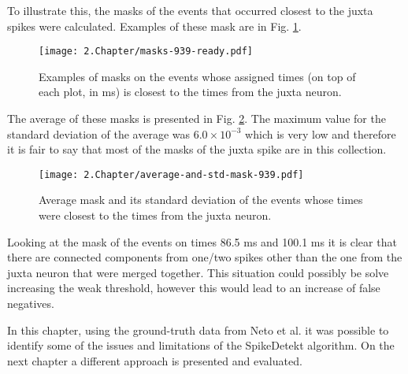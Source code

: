 To illustrate this, the masks of the events that occurred closest to the juxta spikes were calculated. Examples of these mask are in Fig. \ref{fig:masks-examples}.
 
\begin{figure}[!h]
	\centering
	\texttt{[image: 2.Chapter/masks-939-ready.pdf]}
	\caption{Examples of masks on the events whose assigned times (on top of each plot, in ms) is closest to the times from the juxta neuron.
}
\label{fig:masks-examples}
\end{figure}

The average of these masks is presented in Fig. \ref{fig:masks-average-std}. The maximum value for the standard deviation of the average was $6.0 \times 10^{-3}$ which is very low and therefore it is fair to say that most of the masks of the juxta spike are in this collection.

\begin{figure}[!h]
	\centering
	\texttt{[image: 2.Chapter/average-and-std-mask-939.pdf]}
	\caption{Average mask and its standard deviation of the events whose times were closest to the times from the juxta neuron.
}
\label{fig:masks-average-std}
\end{figure}


Looking at the mask of the events on times 86.5 ms  and 100.1 ms it is clear that there are connected components from one/two spikes other than the one from the juxta neuron that were merged together. This situation could possibly be solve increasing the weak threshold, however this would lead to an increase of false negatives. 

In this chapter, using the ground-truth data from Neto et al. it was possible to identify some of the issues and limitations of the SpikeDetekt algorithm. On the next chapter a different approach is presented and evaluated.
